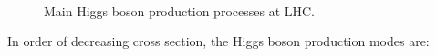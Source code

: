 \begin{figure}[htb]
\centering
{}
\\
\caption{Main Higgs boson production processes at LHC.}\label{fig:higgs_prod}
\end{figure}

\noindent In order of decreasing cross section, the Higgs boson production modes are:

